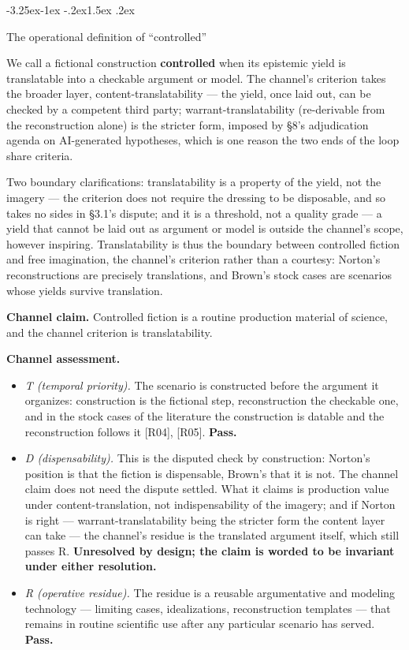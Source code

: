 \documentclass[11pt,a4paper]{article}
\makeatletter
\renewcommand\subsection{\@startsection{subsection}{2}{\z@}%
  {-3.25ex\@plus -1ex \@minus -.2ex}{1.5ex \@plus .2ex}%
  {\normalfont\large\bfseries\raggedright}}
\makeatother
\begin{document}
\subsection{The operational definition of ``controlled''}

We call a fictional construction \textbf{controlled} when its epistemic yield is translatable into a checkable argument or model. The channel's criterion takes the broader layer, content-translatability — the yield, once laid out, can be checked by a competent third party; warrant-translatability (re-derivable from the reconstruction alone) is the stricter form, imposed by §8's adjudication agenda on AI-generated hypotheses, which is one reason the two ends of the loop share criteria.

Two boundary clarifications: translatability is a property of the yield, not the imagery — the criterion does not require the dressing to be disposable, and so takes no sides in §3.1's dispute; and it is a threshold, not a quality grade — a yield that cannot be laid out as argument or model is outside the channel's scope, however inspiring. Translatability is thus the boundary between controlled fiction and free imagination, the channel's criterion rather than a courtesy: Norton's reconstructions are precisely translations, and Brown's stock cases are scenarios whose yields survive translation.

\textbf{Channel claim.} Controlled fiction is a routine production material of science, and the channel criterion is translatability.

\textbf{Channel assessment.}

\begin{itemize}[leftmargin=1.6em,itemsep=2pt,parsep=0pt,topsep=3pt]
\item \textit{T (temporal priority).} The scenario is constructed before the argument it organizes: construction is the fictional step, reconstruction the checkable one, and in the stock cases of the literature the construction is datable and the reconstruction follows it [R04], [R05]. \textbf{Pass.}
\item \textit{D (dispensability).} This is the disputed check by construction: Norton's position is that the fiction is dispensable, Brown's that it is not. The channel claim does not need the dispute settled. What it claims is production value under content-translation, not indispensability of the imagery; and if Norton is right — warrant-translatability being the stricter form the content layer can take — the channel's residue is the translated argument itself, which still passes R. \textbf{Unresolved by design; the claim is worded to be invariant under either resolution.}
\item \textit{R (operative residue).} The residue is a reusable argumentative and modeling technology — limiting cases, idealizations, reconstruction templates — that remains in routine scientific use after any particular scenario has served. \textbf{Pass.}
\end{itemize}
\end{document}
